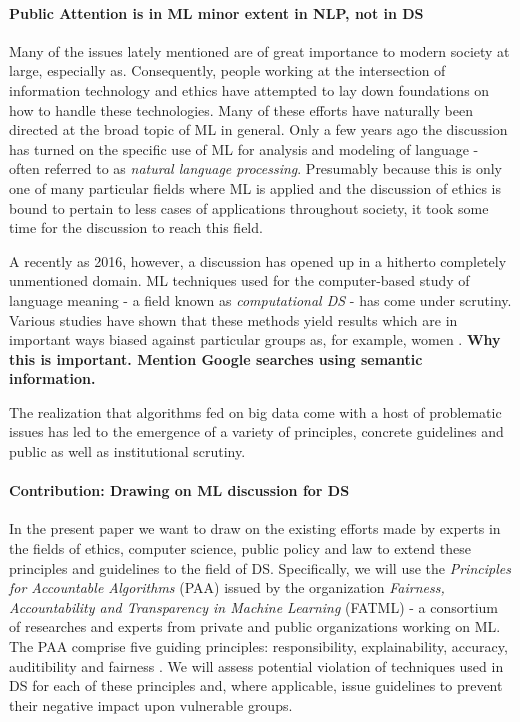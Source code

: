 \documentclass{article}
\begin{document}
\paragraph{Public Attention is in ML minor extent in NLP, not in DS}
Many of the issues lately mentioned are of great importance to modern society at large, especially as. Consequently, people working at the intersection of information technology and ethics have attempted to lay down foundations on how to handle these technologies. Many of these efforts have naturally been directed at the broad topic of ML in general.\cite{leidner2017ehtical} Only a few years ago the discussion has turned on the specific use of ML for analysis and modeling of language - often referred to as \emph{natural language processing}. Presumably because this is only one of many particular fields where ML is applied and the discussion of ethics  is bound to pertain to less cases of applications throughout society, it took some time for the discussion to reach this field.

A recently as 2016, however, a discussion has opened up in a hitherto completely unmentioned domain. ML techniques used for the computer-based study of language meaning - a field known as \emph{computational DS} - has come under scrutiny.
Various studies have shown that these methods yield results which are in important ways biased against particular groups as, for example, women \cite{google} \cite{wagner2015s}.
\textbf{Why this is important. Mention Google searches using semantic information.} 

The realization that algorithms fed on big data come with a host of problematic issues has led to the emergence of a variety of principles, concrete guidelines and public as well as institutional scrutiny.

\paragraph{Contribution: Drawing on ML discussion for DS}
In the present paper we want to draw on the existing efforts made by experts in the fields of ethics, computer science, public policy and law to extend these principles and guidelines to the field of DS. Specifically, we will use the \emph{Principles for Accountable Algorithms} (PAA) issued by the organization \emph{Fairness, Accountability and Transparency in Machine Learning} (FATML) - a consortium of researches and experts from private and public organizations working on ML. 
The PAA comprise five guiding principles: responsibility, explainability, accuracy, auditibility and fairness \cite{principles}.
We will assess potential violation of techniques used in DS for each of these principles and, where applicable, issue guidelines to prevent their negative impact upon vulnerable groups. 
\end{document}
